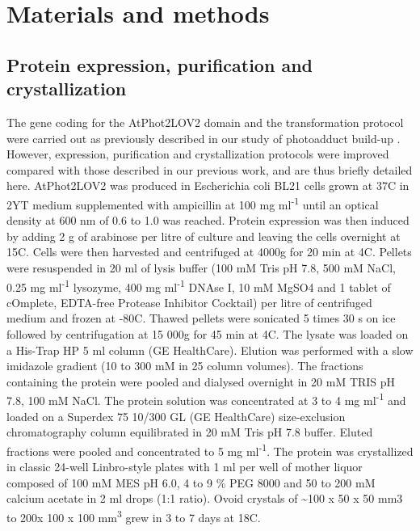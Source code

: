 \section{Materials and methods}\label{sec:LOV2_methods}

\subsection{Protein expression, purification and crystallization}
The gene coding for the AtPhot2LOV2 domain and the transformation protocol were carried out as previously described in our study of photoadduct build-up \parencite{aumonierMillisecondTimeresolvedSerial2020}. However, expression, purification and crystallization protocols were improved compared with those described in our previous work, and are thus briefly detailed here. AtPhot2LOV2 was produced in Escherichia coli BL21 cells grown at 37\degree C in 2YT medium supplemented with ampicillin at 100 mg ml\textsuperscript{-1} until an optical density at 600 nm of 0.6 to 1.0 was reached. Protein expression was then induced by adding 2 g of arabinose per litre of culture and leaving the cells overnight at 15\degree C. Cells were then harvested and centrifuged at 4000g for 20 min at 4\degree C. Pellets were resuspended in 20 ml of lysis buffer (100 mM Tris pH 7.8, 500 mM NaCl, 0.25 mg ml\textsuperscript{-1} lysozyme, 400 mg ml\textsuperscript{-1} DNAse I, 10 mM MgSO4 and 1 tablet of cOmplete, EDTA-free Protease Inhibitor Cocktail) per litre of centrifuged medium and frozen at -80\degree C. Thawed pellets were sonicated 5 times 30 s on ice followed by centrifugation at 15 000g for 45 min at 4\degree C. The lysate was loaded on a His-Trap HP 5 ml column (GE HealthCare). Elution was performed with a slow imidazole gradient (10 to 300 mM in 25 column volumes). The fractions containing the protein were pooled and dialysed overnight in 20 mM TRIS pH 7.8, 100 mM NaCl. The protein solution was concentrated at 3 to 4 mg ml\textsuperscript{-1} and loaded on a Superdex 75 10/300 GL (GE HealthCare) size-exclusion chromatography column equilibrated in 20 mM Tris pH 7.8 buffer. Eluted fractions were pooled and concentrated to 5 mg ml\textsuperscript{-1}. The protein was crystallized in classic 24-well Linbro-style plates with 1 ml per well of mother liquor composed of 100 mM MES pH 6.0, 4 to 9 \%  PEG 8000 and 50 to 200 mM calcium acetate in 2 ml drops (1:1 ratio). Ovoid crystals of \textasciitilde 100 x 50 x 50 mm3 to 200x 100 x 100 mm\textsuperscript{3} grew in 3 to 7 days at 18\degree C.
